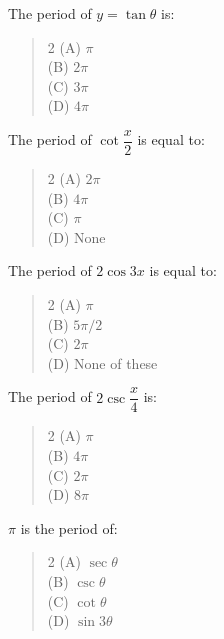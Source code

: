 \documentclass[11pt,a4paper]{article}
\begin{document}
\begin{mcqlist}
\item The period of $y=\tan\theta$ is:
\begin{quote}\begin{multicols}{2}
\noindent (A) $\pi$ \\
(B) $2\pi$ \\
(C) $3\pi$ \\
(D) $4\pi$
\end{multicols}\end{quote}

\item The period of $\cot\dfrac{x}{2}$ is equal to:
\begin{quote}\begin{multicols}{2}
\noindent (A) $2\pi$ \\
(B) $4\pi$ \\
(C) $\pi$ \\
(D) None
\end{multicols}\end{quote}

\item The period of $2\cos3x$ is equal to:
\begin{quote}\begin{multicols}{2}
\noindent (A) $\pi$ \\
(B) $5\pi/2$ \\
(C) $2\pi$ \\
(D) None of these
\end{multicols}\end{quote}

\item The period of $2\csc\dfrac{x}{4}$ is:
\begin{quote}\begin{multicols}{2}
\noindent (A) $\pi$ \\
(B) $4\pi$ \\
(C) $2\pi$ \\
(D) $8\pi$
\end{multicols}\end{quote}

\item $\pi$ is the period of:
\begin{quote}\begin{multicols}{2}
\noindent (A) $\sec\theta$ \\
(B) $\csc\theta$ \\
(C) $\cot\theta$ \\
(D) $\sin3\theta$
\end{multicols}\end{quote}


\end{mcqlist}
\end{document}
